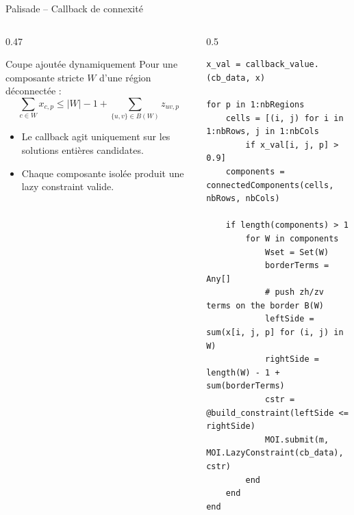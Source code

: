 \documentclass[11pt,aspectratio=169]{beamer}
\begin{document}
\begin{frame}[fragile]{Palisade -- Callback de connexité}
\footnotesize
\begin{columns}[T,onlytextwidth]
\begin{column}{0.47\textwidth}
\begin{block}{Coupe ajoutée dynamiquement}
Pour une composante stricte \(W\) d'une région déconnectée :
\[
\sum_{c\in W}x_{c,p}
\le |W|-1+\sum_{\{u,v\}\in B(W)}z_{uv,p}
\]
\end{block}
\begin{itemize}
  \item Le callback agit uniquement sur les solutions entières candidates.
  \item Chaque composante isolée produit une lazy constraint valide.
\end{itemize}
\end{column}
\begin{column}{0.5\textwidth}
\begin{lstlisting}[basicstyle=\ttfamily\fontsize{5.0}{5.7}\selectfont]
x_val = callback_value.(cb_data, x)

for p in 1:nbRegions
    cells = [(i, j) for i in 1:nbRows, j in 1:nbCols
        if x_val[i, j, p] > 0.9]
    components = connectedComponents(cells, nbRows, nbCols)

    if length(components) > 1
        for W in components
            Wset = Set(W)
            borderTerms = Any[]
            # push zh/zv terms on the border B(W)
            leftSide = sum(x[i, j, p] for (i, j) in W)
            rightSide = length(W) - 1 + sum(borderTerms)
            cstr = @build_constraint(leftSide <= rightSide)
            MOI.submit(m, MOI.LazyConstraint(cb_data), cstr)
        end
    end
end
\end{lstlisting}
\end{column}
\end{columns}
\end{frame}
\end{document}
